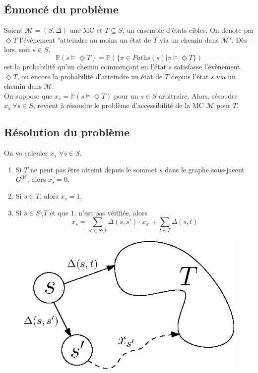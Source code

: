 \documentclass[12pt,a4paper]{report}
\theoremstyle{definition}
\theoremstyle{remark}
\begin{document}
\subsection{\'Ennoncé du problème}
Soient $\mathcal{M} = (S, \Delta)$ une MC et $T \subseteq S$, un ensemble d'états cibles. On dénote par $\Diamond T$ l'évènement "atteindre au moins un état de $T$ via un chemin dans $\mathcal{M}$". Dès lors, soit $s \in S$, \[\mathbb{P}(s \models \Diamond T) = \mathbb{P}(\{\pi \in \textit{Paths}(s) | \pi \models \Diamond T\})\] est la probabilité qu'un chemin commençant en l'état $s$ satisfasse l'évènement $\Diamond T$, ou encore la probabilité d'atteindre un état de $T$ depuis l'état $s$ via un chemin dans $\mathcal{M}$.\\
On suppose que $x_s = \mathbb{P}(s \models \Diamond T)$ pour un $s \in S$ arbitraire. Alors, résoudre $x_s \; \forall s\in S$, revient à résoudre le problème d'accessibilité de la MC $\mathcal{M}$ pour $T$.
\subsection{Résolution du problème}
On va calculer $x_s$ $ \forall s \in S$.
\begin{enumerate}
	\item Si $T$ ne peut pas être atteint depuis le sommet $s$ dans le graphe sous-jacent $G^\mathcal{M}$, alors $x_s = 0$.
	\item Si $s \in T$, alors $x_s = 1$.
	\item Si $s \in S \setminus T$ et que $1.$ n'est pas vérifiée, alors 
		\[ x_s = \sum_{s' \in S \setminus T} \Delta(s, s') \cdot x_{s'} + \sum_{t \in T} \Delta(s, t) \]
\end{enumerate}

\begin{figure}[H]
	\centering
	\includegraphics[scale=0.6]{figures/reachability.eps}
	\label{reachablity}
\end{figure}
\end{document}
